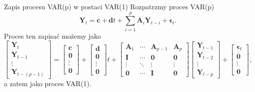 \documentclass[a4paper, 11pt]{beamer}
\begin{document}
	\begin{frame}{Zapis procesu VAR(p) w postaci VAR(1)}
		Rozpatrzmy proces VAR(p) \[
			\boldsymbol{Y}_{t} =
				\boldsymbol{c} +
				\boldsymbol{d} t +
				\sum_{i=1}^{p}
					\boldsymbol{A}_{i} \boldsymbol{Y}_{t-i} +
					\boldsymbol{\epsilon}_{t}.
		\]
		Proces ten zapisać możemy jako \[
			\left[\begin{matrix}
				\boldsymbol{Y}_{t}\\
				\boldsymbol{Y}_{t-1}\\
				\vdots\\
				\boldsymbol{Y}_{t-\left(p-1\right)}
			\end{matrix}\right] = \left[\begin{matrix}
				\boldsymbol{c}\\
				\boldsymbol{0}\\
				\vdots\\
				\boldsymbol{0}
			\end{matrix}\right] + \left[\begin{matrix}
				\boldsymbol{d}\\
				\boldsymbol{0}\\
				\vdots\\
				\boldsymbol{0}
			\end{matrix}\right] t + \left[\begin{matrix}
				\boldsymbol{A}_{1} & 
				\cdots & \boldsymbol{A}_{p-1} & \boldsymbol{A}_{p}\\
				\boldsymbol{I} & 
				\cdots & \boldsymbol{0} & \boldsymbol{0}\\
				\vdots & \ddots & \vdots & \vdots\\
				\boldsymbol{0} & 
				\cdots & \boldsymbol{I} & \boldsymbol{0}
			\end{matrix}\right] \left[\begin{matrix}
				\boldsymbol{Y}_{t-1}\\
				\boldsymbol{Y}_{t-2}\\
				\vdots\\
				\boldsymbol{Y}_{t-p}
			\end{matrix}\right] + \left[\begin{matrix}
				\boldsymbol{\epsilon}_{t}\\
				\boldsymbol{0}\\
				\vdots\\
				\boldsymbol{0}
			\end{matrix}\right],
		\]
		a zatem jako proces VAR(1).
	\end{frame}
\end{document}
